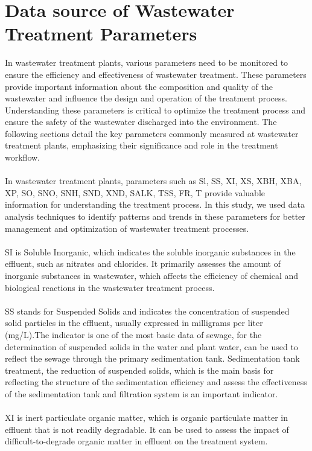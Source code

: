 \documentclass[]{iat}
\begin{document}
\section{Data source of Wastewater Treatment Parameters}
In wastewater treatment plants, various parameters need to be monitored to ensure the efficiency and effectiveness of wastewater treatment. These parameters provide important information about the composition and quality of the wastewater and influence the design and operation of the treatment process. Understanding these parameters is critical to optimize the treatment process and ensure the safety of the wastewater discharged into the environment. The following sections detail the key parameters commonly measured at wastewater treatment plants, emphasizing their significance and role in the treatment workflow.\\
\\
In wastewater treatment plants, parameters such as Sl, SS, XI, XS, XBH, XBA, XP, SO, SNO, SNH, SND, XND, SALK, TSS, FR, T provide valuable information for understanding the treatment process. In this study, we used data analysis techniques to identify patterns and trends in these parameters for better management and optimization of wastewater treatment processes.\\
\\
SI is Soluble Inorganic, which indicates the soluble inorganic substances in the effluent, such as nitrates and chlorides. It primarily assesses the amount of inorganic substances in wastewater, which affects the efficiency of chemical and biological reactions in the wastewater treatment process.\\
\\
SS stands for Suspended Solids and indicates the concentration of suspended solid particles in the effluent, usually expressed in milligrams per liter (mg/L).The indicator is one of the most basic data of sewage, for the determination of suspended solids in the water and plant water, can be used to reflect the sewage through the primary sedimentation tank. Sedimentation tank treatment, the reduction of suspended solids, which is the main basis for reflecting the structure of the sedimentation efficiency and assess the effectiveness of the sedimentation tank and filtration system is an important indicator.\\
\\
XI is inert particulate organic matter, which is organic particulate matter in effluent that is not readily degradable. It can be used to assess the impact of difficult-to-degrade organic matter in effluent on the treatment system.\\
\end{document}

